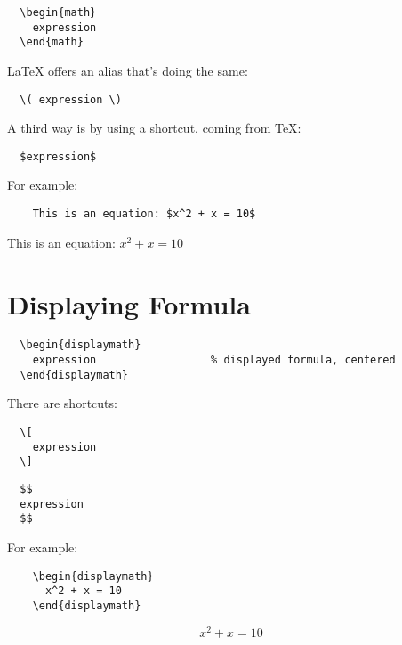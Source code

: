 \begin{lstlisting}
  \begin{math}
    expression
  \end{math}
\end{lstlisting}

LaTeX offers an alias that's doing the same:

\begin{lstlisting}
  \( expression \)
\end{lstlisting}

A third way is by using a shortcut, coming from TeX:

\begin{lstlisting}
  $expression$
\end{lstlisting}

For example:
\begin{tcolorbox}
  \begin{lstlisting}
    This is an equation: $x^2 + x = 10$
  \end{lstlisting}
  This is an equation: $x^2 + x = 10$
\end{tcolorbox}

\section{Displaying Formula}

\begin{lstlisting}
  \begin{displaymath}
    expression                  % displayed formula, centered
  \end{displaymath}
\end{lstlisting}


There are shortcuts:
\begin{lstlisting}
  \[
    expression
  \]
\end{lstlisting}

\begin{lstlisting}
  $$
  expression
  $$
\end{lstlisting}



For example:
\begin{tcolorbox}
  \begin{lstlisting}
    \begin{displaymath}
      x^2 + x = 10
    \end{displaymath}
  \end{lstlisting}
  \begin{displaymath}
    x^2 + x = 10
  \end{displaymath}

\end{tcolorbox}


